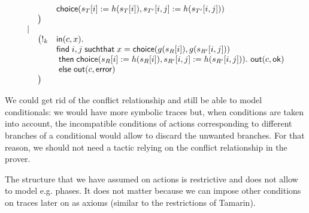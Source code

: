 \begin{example}[OSK]
\[\begin{array}{lll}
  && \mathsf{choice}(s_T[i] := h(s_T[i]),s_{T'}[i,j] := h(s_{T'}[i,j])) \\
  & \bigr) & \\
  \mid & \\
  & \bigl(!_k & \textsf{in}(c,x). \\
  && \textsf{find}\; i,j \;\textsf{suchthat}\; x = \mathsf{choice}(g(s_R[i]),g(s_{R'}[i,j])) \\
  && \;\textsf{then}\; \mathsf{choice}(s_R[i] := h(s_R[i]),s_{R'}[i,j] := h(s_{R'}[i,j])) .~\textsf{out}(c,\mathsf{ok}) \\
  && \;\textsf{else}\; \textsf{out}(c,\mathsf{error}) \\
  & \bigr) & \\
  \end{array}
  \]
\end{example}

\bigskip
\noindent
\begin{remark}
  We could get rid of the conflict relationship and still be able to
  model conditionals: we would have more symbolic traces but, when conditions
  are taken into account, the incompatible conditions of actions corresponding
  to different branches of a conditional would allow to discard
  the unwanted branches. For that reason, we should not need a tactic
  relying on the conflict relationship in the prover.
\end{remark}

\begin{remark}
  The structure that we have assumed on actions is restrictive and
  does not allow to model e.g. phases. It does not matter because we can
  impose other conditions on traces later on as axioms (similar to the
  restrictions of Tamarin).
\end{remark}
